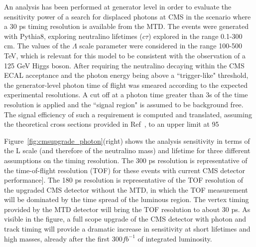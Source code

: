 An analysis has been performed at generator level in order to evaluate the sensitivity power of a
search for displaced photons at CMS in the scenario where a 30 ps timing resolution is available from the MTD. The events were generated with Pythia8, exploring neutralino lifetimes ($c\tau$) explored in the range 0.1-300 cm. 
The values of the $\Lambda$ scale parameter were considered in the range 100-500 TeV, which is relevant for this model to be consistent with the observation of a 125 GeV Higgs boson. 
After requiring the neutralino decaying within the CMS ECAL acceptance and the photon energy being above a ``trigger-like" threshold, the generator-level photon time of flight was smeared according to the expected experimental resolutions. A cut
off at a photon time greater than 3s of the time resolution is applied and the ``signal region" is assumed to be background free. The signal efficiency of such a requirement is computed and translated, assuming the theoretical cross sections provided in Ref~\cite{ref:GMSB}, to an upper limit at 95%

Figure~\ref{fig:cmsupgrade_photon}(right) shows the analysis sensitivity in terms of the L scale (and therefore of the neutralino mass) and lifetime for three different assumptions on the timing resolution. 
The 300 ps resolution is representative of the time-of-flight resolution (TOF) for these events with current CMS detector performance]. 
The 180 ps resolution is representative of the TOF resolution of the upgraded CMS detector without the MTD, in which the TOF measurement will be dominated by the time spread of the luminous region. 
The vertex timing provided by the MTD detector will bring the TOF resolution to about 30 ps. 
As visible in the figure, a full scope upgrade of the CMS detector with photon and track timing will provide a dramatic increase in sensitivity at short lifetimes and high masses, already after the first $300 fb^{-1}$ of integrated luminosity.

